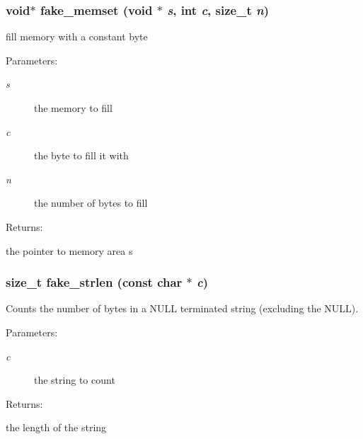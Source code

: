 \subsubsection{\setlength{\rightskip}{0pt plus 5cm}void$\ast$ fake\_\-memset (void $\ast$ {\em s}, int {\em c}, size\_\-t {\em n})}\label{group__fake__lib_a1}


fill memory with a constant byte

\begin{Desc}
\item[Parameters: ]\par
\begin{description}
\item[{\em 
s}]the memory to fill \item[{\em 
c}]the byte to fill it with \item[{\em 
n}]the number of bytes to fill \end{description}
\end{Desc}
\begin{Desc}
\item[Returns: ]\par
the pointer to memory area s \end{Desc}
\subsubsection{\setlength{\rightskip}{0pt plus 5cm}size\_\-t fake\_\-strlen (const char $\ast$ {\em c})}\label{group__fake__lib_a0}


Counts the number of bytes in a NULL terminated string (excluding the NULL).

\begin{Desc}
\item[Parameters: ]\par
\begin{description}
\item[{\em 
c}]the string to count \end{description}
\end{Desc}
\begin{Desc}
\item[Returns: ]\par
the length of the string \end{Desc}
